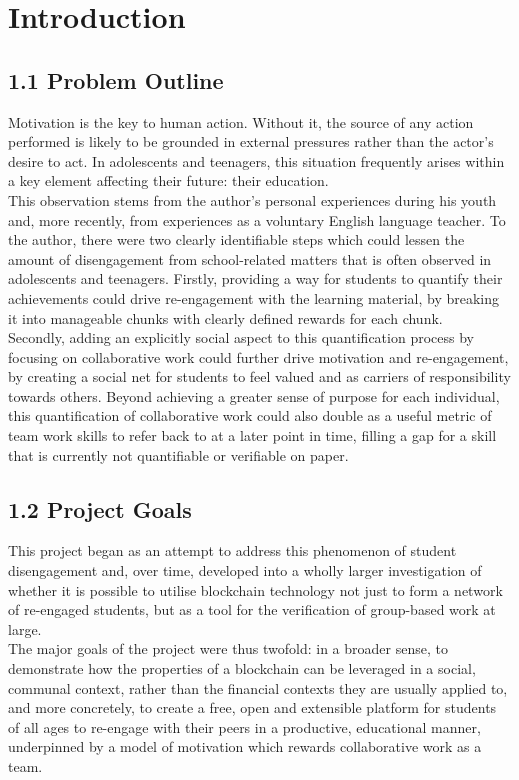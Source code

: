 \chapter{Introduction}

\section{1.1 Problem Outline}\label{problem-outline}

Motivation is the key to human action. Without it, the source of any
action performed is likely to be grounded in external pressures rather
than the actor's desire to act. In adolescents and teenagers, this
situation frequently arises within a key element affecting their future:
their education.\\
This observation stems from the author's personal experiences during his
youth and, more recently, from experiences as a voluntary English
language teacher. To the author, there were two clearly identifiable
steps which could lessen the amount of disengagement from school-related
matters that is often observed in adolescents and teenagers. Firstly,
providing a way for students to quantify their achievements could drive
re-engagement with the learning material, by breaking it into manageable
chunks with clearly defined rewards for each chunk.\\
Secondly, adding an explicitly social aspect to this quantification
process by focusing on collaborative work could further drive motivation
and re-engagement, by creating a social net for students to feel valued
and as carriers of responsibility towards others. Beyond achieving a
greater sense of purpose for each individual, this quantification of
collaborative work could also double as a useful metric of team work
skills to refer back to at a later point in time, filling a gap for a
skill that is currently not quantifiable or verifiable on paper.

\section{1.2 Project Goals}\label{project-goals}

This project began as an attempt to address this phenomenon of student
disengagement and, over time, developed into a wholly larger
investigation of whether it is possible to utilise blockchain technology
not just to form a network of re-engaged students, but as a tool for the
verification of group-based work at large.\\
The major goals of the project were thus twofold: in a broader sense, to
demonstrate how the properties of a blockchain can be leveraged in a
social, communal context, rather than the financial contexts they are
usually applied to, and more concretely, to create a free, open and
extensible platform for students of all ages to re-engage with their
peers in a productive, educational manner, underpinned by a model of
motivation which rewards collaborative work as a team.

